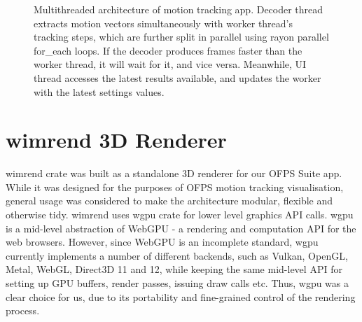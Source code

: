 \documentclass[11pt,english]{report}
\begin{document}
\begin{figure}[!ht]
	\caption{\centering Multithreaded architecture of motion tracking app. Decoder thread extracts motion vectors simultaneously with worker thread's tracking steps, which are further split in parallel using rayon parallel for\_each loops. If the decoder produces frames faster than the worker thread, it will wait for it, and vice versa. Meanwhile, UI thread accesses the latest results available, and updates the worker with the latest settings values. }
\end{figure}

\section{wimrend 3D Renderer}

wimrend crate was built as a standalone 3D renderer for our OFPS Suite app. While it was designed for the purposes of OFPS motion tracking visualisation, general usage was considered to make the architecture modular, flexible and otherwise tidy. wimrend uses wgpu crate for lower level graphics API calls. wgpu is a mid-level abstraction of WebGPU - a rendering and computation API for the web browsers\cite{webgpu}. However, since WebGPU is an incomplete standard, wgpu currently implements a number of different backends, such as Vulkan, OpenGL, Metal, WebGL, Direct3D 11 and 12, while keeping the same mid-level API for setting up GPU buffers, render passes, issuing draw calls etc. Thus, wgpu was a clear choice for us, due to its portability and fine-grained control of the rendering process.
\end{document}
